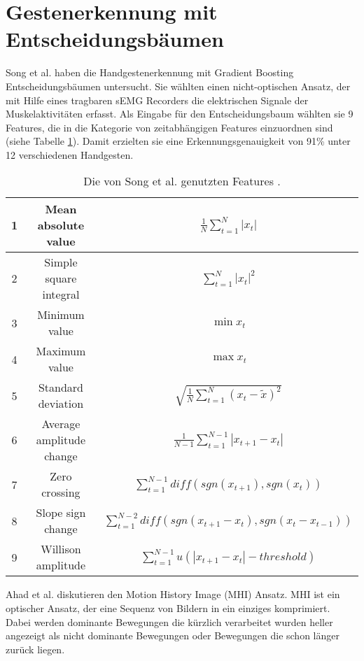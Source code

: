 \section{Gestenerkennung mit Entscheidungsbäumen}
\label{sec:sota_misc}
Song et al. \cite{song2019design} haben die Handgestenerkennung mit Gradient Boosting Entscheidungsbäumen untersucht. Sie wählten einen nicht-optischen Ansatz, der mit Hilfe eines tragbaren sEMG Recorders
die elektrischen Signale der Muskelaktivitäten erfasst. Als Eingabe für den Entscheidungsbaum wählten sie 9 Features, die in die Kategorie von zeitabhängigen Features einzuordnen sind
(siehe Tabelle \ref{tab:songFeatures}). Damit erzielten sie eine Erkennungsgenauigkeit von 91\% unter 12 verschiedenen Handgesten.
\begin{table}[h!]
    \centering
    \begin{tabular}{ c | c | c }
        \hline
        \hline
        1 & Mean absolute value & $\frac{1}{N}\sum^N_{t=1} |x_t|$ \\\hline
        2 & Simple square integral & $\sum^N_{t=1} |x_t|^2$ \\\hline
        3 & Minimum value & $\min x_t$ \\\hline
        4 & Maximum value & $\max x_t$ \\\hline
        5 & Standard deviation & $\sqrt{\frac{1}{N}\sum^N_{t=1}(x_t - \tilde{x})^2}$ \\\hline
        6 & Average amplitude change & $\frac{1}{N-1}\sum^{N-1}_{t=1} |x_{t + 1} - x_t|$ \\\hline
        7 & Zero crossing & $\sum^{N-1}_{t=1}diff(sgn(x_{t+1}),sgn(x_t))$ \\\hline
        8 & Slope sign change & $\sum^{N-2}_{t=1}diff(sgn(x_{t+1} - x_t),sgn(x_t - x_{t - 1}))$ \\\hline
        9 & Willison amplitude & $\sum^{N-1}_{t=1}u(|x_{t+1} - x_t| - threshold)$ \\
        \hline
        \hline
    \end{tabular}
    \caption{Die von Song et al. genutzten Features \cite{song2019design}.}
    \label{tab:songFeatures}
\end{table}
\newline
\newline
Ahad et al. \cite{ahad2012motion} diskutieren den Motion History Image (MHI) Ansatz. MHI ist ein optischer Ansatz, der eine Sequenz von Bildern in ein einziges komprimiert. Dabei werden dominante Bewegungen die
kürzlich verarbeitet wurden heller angezeigt als nicht dominante Bewegungen oder Bewegungen die schon länger zurück liegen.
